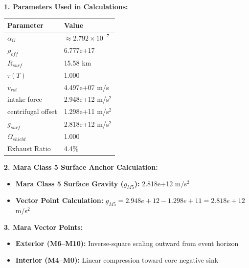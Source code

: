 \documentclass[11pt, a4paper]{article}
\begin{document}
\vspace{0.5em}
\noindent \textbf{1. Parameters Used in Calculations:}
\begin{center}
  \begin{tabular}{|l|l|}
    \hline
    \textbf{Parameter} & \textbf{Value} \\ \hline
    $\alpha_G$ & $\approx 2.792 \times 10^{-7}$ \\ \hline
    $\rho_{eff}$ & 6.777e+17 \\ \hline
    $R_{surf}$ & 15.58 km \\ \hline
    $\tau(T)$ & 1.000 \\ \hline
    $v_{rot}$ & 4.497e+07 m/s \\ \hline
    intake force & 2.948e+12 m/s$^2$ \\ \hline
    centrifugal offset & 1.298e+11 m/s$^2$ \\ \hline
    $g_{surf}$ & 2.818e+12 m/s$^2$ \\ \hline
    $\Omega_{shield}$ & 1.000 \\ \hline
    Exhaust Ratio & 4.4\% \\ \hline
  \end{tabular}
\end{center}

\vspace{0.5em}
\noindent \textbf{2. Mara Class 5 Surface Anchor Calculation:}
\begin{itemize}
  \item \textbf{Mara Class 5 Surface Gravity ($g_{M5}$):} 2.818e+12 m/s$^2$
  \item \textbf{Vector Point Calculation:} $g_{M5} = 2.948e+12 - 1.298e+11 = 2.818e+12$ m/s$^2$
\end{itemize}

\vspace{0.5em}
\noindent \textbf{3. Mara Vector Points:}
\begin{itemize}
  \item \textbf{Exterior (M6--M10):} Inverse-square scaling outward from event horizon
  \item \textbf{Interior (M4--M0):} Linear compression toward core negative sink
\end{itemize}
\end{document}
